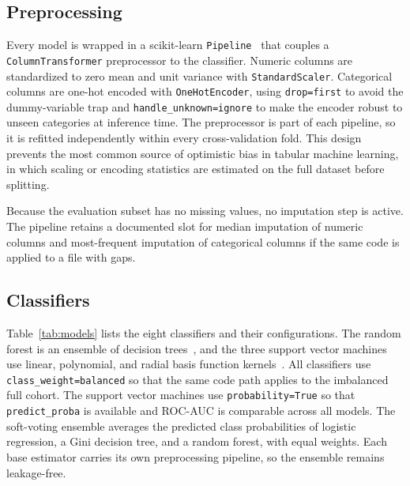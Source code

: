 \documentclass[conference]{IEEEtran}
\begin{document}
\subsection{Preprocessing}

Every model is wrapped in a scikit-learn \texttt{Pipeline}~\cite{pedregosa2011scikit} that couples a \texttt{ColumnTransformer} preprocessor to the classifier. Numeric columns are standardized to zero mean and unit variance with \texttt{StandardScaler}. Categorical columns are one-hot encoded with \texttt{OneHotEncoder}, using \texttt{drop=first} to avoid the dummy-variable trap and \texttt{handle\_unknown=ignore} to make the encoder robust to unseen categories at inference time. The preprocessor is part of each pipeline, so it is refitted independently within every cross-validation fold. This design prevents the most common source of optimistic bias in tabular machine learning, in which scaling or encoding statistics are estimated on the full dataset before splitting.

Because the evaluation subset has no missing values, no imputation step is active. The pipeline retains a documented slot for median imputation of numeric columns and most-frequent imputation of categorical columns if the same code is applied to a file with gaps.

\subsection{Classifiers}

Table~\ref{tab:models} lists the eight classifiers and their configurations. The random forest is an ensemble of decision trees~\cite{breiman2001random}, and the three support vector machines use linear, polynomial, and radial basis function kernels~\cite{cortes1995support}. All classifiers use \texttt{class\_weight=balanced} so that the same code path applies to the imbalanced full cohort. The support vector machines use \texttt{probability=True} so that \texttt{predict\_proba} is available and ROC-AUC is comparable across all models. The soft-voting ensemble averages the predicted class probabilities of logistic regression, a Gini decision tree, and a random forest, with equal weights. Each base estimator carries its own preprocessing pipeline, so the ensemble remains leakage-free.
\end{document}

